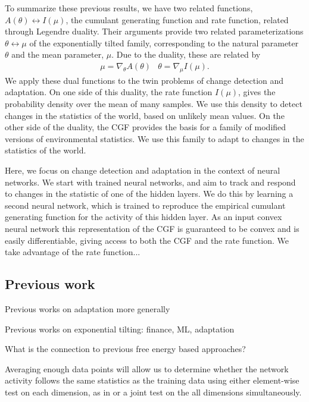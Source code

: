 \documentclass[10pt]{article}      %
\begin{document}
To summarize these previous results, we have two related functions, $A(\theta) \leftrightarrow I(\mu)$, the cumulant generating function and rate function, 
related through Legendre duality.
Their arguments provide two related parameterizations $\theta \leftrightarrow \mu$ of the exponentially tilted family, corresponding to the natural parameter $\theta$ and the mean parameter, $\mu$.
Due to the duality, these are related by 
\begin{eqnarray}
  \mu = \nabla_\theta A(\theta) & \theta = \nabla_\mu I(\mu). \label{eq:duality_relations}
\end{eqnarray}
We apply these dual functions to the twin problems of change detection and adaptation.
On one side of this duality, the rate function $I(\mu)$, gives the probability density over the mean of many samples.
We use this density to detect changes in the statistics of the world, based on unlikely mean values.
On the other side of the duality, the CGF provides the basis for a family of modified versions of environmental statistics.
We use this family to adapt to changes in the statistics of the world. 

Here, we focus on change detection and adaptation in the context of neural networks. 
We start with trained neural networks, and aim to track and respond to changes in the statistic of one of the hidden layers. 
We do this by learning a second neural network, which is trained to reproduce the empirical cumulant generating function for the activity of this hidden layer.
As an input convex neural network \cite{amos_input_2017} this representation of the CGF is guaranteed to be convex and is easily differentiable, giving access to both the CGF and the rate function.
We take advantage of the rate function...





\subsection{Previous work}

Previous works on adaptation more generally

Previous works on exponential tilting: finance, ML, adaptation 


What is the connection to previous free energy based approaches?


Averaging enough data points will allow us to determine whether the network activity follows the same statistics as the training data using either element-wise test on each dimension, as in \cite{rabanser_failing_2019} or a joint test on the all dimensions simultaneously.
\end{document}
